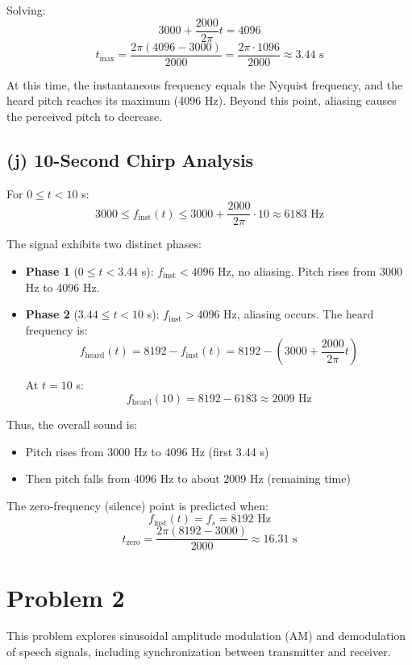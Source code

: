 \documentclass[12pt]{article}
\begin{document}
Solving:
$$3000 + \frac{2000}{2\pi}t = 4096$$
$$t_{\max} = \frac{2\pi(4096 - 3000)}{2000} = \frac{2\pi \cdot 1096}{2000} \approx 3.44 \text{ s}$$

At this time, the instantaneous frequency equals the Nyquist frequency, and the heard pitch reaches its maximum (4096 Hz). Beyond this point, aliasing causes the perceived pitch to decrease.

\subsection*{(j) 10-Second Chirp Analysis}

For $0 \leq t < 10$ s:
$$3000 \leq f_{\text{inst}}(t) \leq 3000 + \frac{2000}{2\pi} \cdot 10 \approx 6183 \text{ Hz}$$

The signal exhibits two distinct phases:

\begin{itemize}
    \item \textbf{Phase 1} ($0 \leq t < 3.44$ s): $f_{\text{inst}} < 4096$ Hz, no aliasing. Pitch rises from 3000 Hz to 4096 Hz.
    \item \textbf{Phase 2} ($3.44 \leq t < 10$ s): $f_{\text{inst}} > 4096$ Hz, aliasing occurs. The heard frequency is:
    $$f_{\text{heard}}(t) = 8192 - f_{\text{inst}}(t) = 8192 - \left(3000 + \frac{2000}{2\pi}t\right)$$
    
    At $t = 10$ s:
    $$f_{\text{heard}}(10) = 8192 - 6183 \approx 2009 \text{ Hz}$$
\end{itemize}

Thus, the overall sound is:
\begin{itemize}
    \item Pitch rises from 3000 Hz to 4096 Hz (first 3.44 s)
    \item Then pitch falls from 4096 Hz to about 2009 Hz (remaining time)
\end{itemize}

The zero-frequency (silence) point is predicted when:
$$f_{\text{inst}}(t) = f_s = 8192 \text{ Hz}$$
$$t_{\text{zero}} = \frac{2\pi(8192 - 3000)}{2000} \approx 16.31 \text{ s}$$



\section*{Problem 2}

This problem explores sinusoidal amplitude modulation (AM) and demodulation of speech signals, including synchronization between transmitter and receiver.
\end{document}
